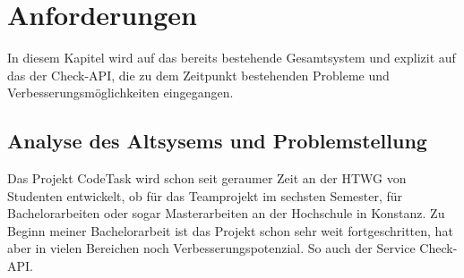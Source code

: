 \chapter{Anforderungen}
\label{chap:requirements}
In diesem Kapitel wird auf das bereits bestehende Gesamtsystem und explizit auf das der Check-API, die zu dem Zeitpunkt bestehenden Probleme und Verbesserungsmöglichkeiten eingegangen.

\section{Analyse des Altsysems und Problemstellung}
\label{section:analyseDesAltsystemsUndProblemstellung}
Das Projekt CodeTask wird schon seit geraumer Zeit an der HTWG von Studenten entwickelt, ob für das Teamprojekt im sechsten Semester, für Bachelorarbeiten oder sogar Masterarbeiten an der Hochschule in Konstanz. Zu Beginn meiner Bachelorarbeit ist das Projekt schon sehr weit fortgeschritten, hat aber in vielen Bereichen noch Verbesserungspotenzial. So auch der Service Check-API.

